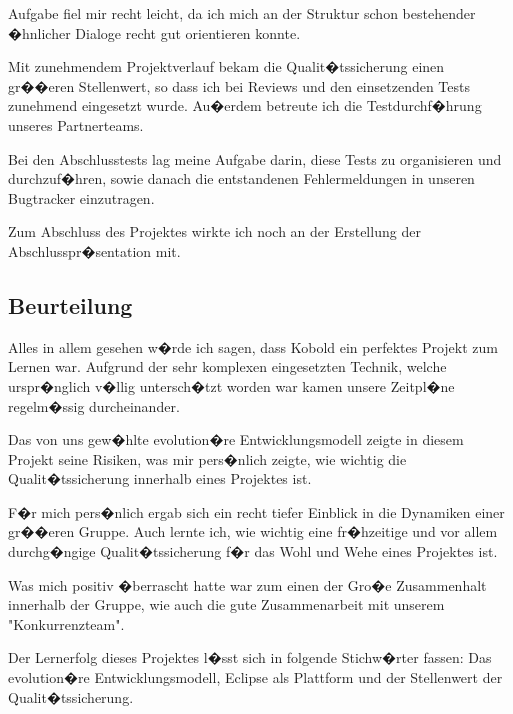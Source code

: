 Aufgabe fiel mir recht leicht, da ich mich an der Struktur schon bestehender
�hnlicher Dialoge recht gut orientieren konnte.\par
Mit zunehmendem Projektverlauf bekam die Qualit�tssicherung einen gr��eren
Stellenwert, so dass ich bei Reviews und den einsetzenden Tests zunehmend
eingesetzt wurde. Au�erdem betreute ich die Testdurchf�hrung unseres
Partnerteams.\par
Bei den Abschlusstests lag meine Aufgabe darin, diese Tests zu organisieren
und durchzuf�hren, sowie danach die entstandenen Fehlermeldungen in unseren
Bugtracker einzutragen. \par
Zum Abschluss des Projektes wirkte ich noch an der Erstellung der
Abschlusspr�sentation mit.

\subsection{Beurteilung}
Alles in allem gesehen w�rde ich sagen, dass Kobold ein perfektes Projekt
zum Lernen war. Aufgrund der sehr komplexen eingesetzten Technik, welche
urspr�nglich v�llig untersch�tzt worden war kamen unsere Zeitpl�ne
regelm�ssig durcheinander.\par
Das von uns gew�hlte evolution�re Entwicklungsmodell zeigte in diesem
Projekt seine Risiken, was mir pers�nlich zeigte, wie wichtig die
Qualit�tssicherung innerhalb eines Projektes ist.\par
F�r mich pers�nlich ergab sich ein recht tiefer Einblick in die Dynamiken
einer gr��eren Gruppe. Auch lernte ich, wie wichtig eine fr�hzeitige und vor
allem durchg�ngige Qualit�tssicherung f�r das Wohl und Wehe eines Projektes
ist. \par
Was mich positiv �berrascht hatte war zum einen der Gro�e Zusammenhalt
innerhalb der Gruppe, wie auch die gute Zusammenarbeit mit unserem
"Konkurrenzteam".\par
Der Lernerfolg dieses Projektes l�sst sich in folgende Stichw�rter fassen:
Das evolution�re Entwicklungsmodell, Eclipse als Plattform und der
Stellenwert der Qualit�tssicherung.


